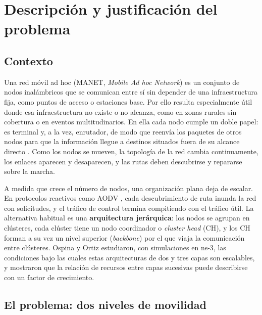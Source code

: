 \section{Descripción y justificación del problema}
\label{sec:problema}

\subsection{Contexto}

Una red móvil ad hoc (MANET, \emph{Mobile Ad hoc Network}) es un conjunto de nodos
inalámbricos que se comunican entre sí sin depender de una infraestructura fija, como
puntos de acceso o estaciones base. Por ello resulta especialmente útil donde esa
infraestructura no existe o no alcanza, como en zonas rurales sin cobertura o en eventos
multitudinarios. En ella cada nodo cumple un doble papel: es terminal y, a la vez,
enrutador, de modo que reenvía los paquetes de otros nodos para que la información llegue
a destinos situados fuera de su alcance directo \cite{sarkar2013adhoc,zarate2021wireless}.
Como los nodos se mueven, la topología de la red cambia continuamente, los enlaces aparecen y desaparecen, y las rutas deben descubrirse y
repararse sobre la marcha.

A medida que crece el número de nodos, una organización plana deja de escalar. En
protocolos reactivos como AODV \cite{rfc3561aodv}, cada descubrimiento de ruta inunda la
red con solicitudes, y el tráfico de control termina compitiendo con el tráfico útil. La
alternativa habitual es una \textbf{arquitectura jerárquica}: los nodos se agrupan en
clústeres, cada clúster tiene un nodo coordinador o \emph{cluster head} (CH), y los CH
forman a su vez un nivel superior (\emph{backbone}) por el que viaja la comunicación entre
clústeres. Ospina y Ortiz \cite{ospina2017growth} estudiaron, con simulaciones en ns-3,
las condiciones bajo las cuales estas arquitecturas de dos y tres capas son escalables, y
mostraron que la relación de recursos entre capas sucesivas puede describirse con un
factor de crecimiento.

\subsection{El problema: dos niveles de movilidad}

